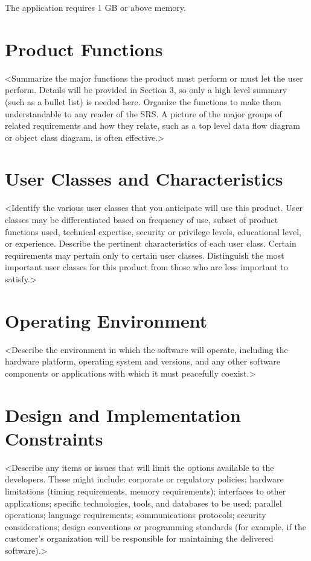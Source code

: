 The application requires 1 GB or above memory.

\section{Product Functions}

<Summarize the major functions the product must perform or must let the user perform. Details will be provided in Section 3, so only a high level summary (such as a bullet list) is needed here. Organize the functions to make them understandable to any reader of the SRS. A picture of the major groups of related requirements and how they relate, such as a top level data flow diagram or object class diagram, is often effective.>

\section{User Classes and Characteristics}

<Identify the various user classes that you anticipate will use this product. User classes may be differentiated based on frequency of use, subset of product functions used, technical expertise, security or privilege levels, educational level, or experience. Describe the pertinent characteristics of each user class. Certain requirements may pertain only to certain user classes. Distinguish the most important user classes for this product from those who are less important to satisfy.>

\section{Operating Environment}

<Describe the environment in which the software will operate, including the hardware platform, operating system and versions, and any other software components or applications with which it must peacefully coexist.>

\section{Design and Implementation Constraints}

<Describe any items or issues that will limit the options available to the developers. These might include: corporate or regulatory policies; hardware limitations (timing requirements, memory requirements); interfaces to other applications; specific technologies, tools, and databases to be used; parallel operations; language requirements; communications protocols; security considerations; design conventions or programming standards (for example, if the customer’s organization will be responsible for maintaining the delivered software).>


